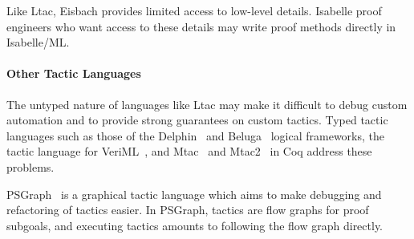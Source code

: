 Like Ltac, Eisbach provides limited access to low-level details.
Isabelle proof engineers who want access to these details may write
proof methods directly in Isabelle/ML. %

%

\paragraph{Other Tactic Languages}


The untyped nature of languages like Ltac may make it difficult to
debug custom automation and to provide strong guarantees on custom
tactics. Typed tactic languages such as those of the
Delphin~\citep{poswolsky2009system} and Beluga~\citep{pientka2008programming} logical frameworks, 
the tactic language for VeriML~\citep{Stampoulis2010}, and
Mtac~\citep{Ziliani2015} and Mtac2~\citep{Kaiser2018} in Coq
address these problems.

PSGraph~\citep{lin2016understanding} is a graphical tactic language which aims to make
debugging and refactoring of tactics easier. In PSGraph, tactics are flow graphs for proof subgoals,
and executing tactics amounts to following the flow graph directly. 

